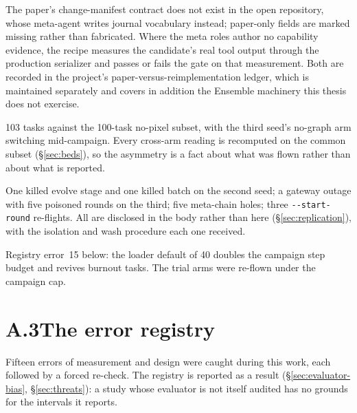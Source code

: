 \begin{description}[leftmargin=1.4em,style=nextline,itemsep=5pt]
  \item[\textnormal{\textbf{Manifest schema and capability evidence.}}]
         The paper's change-manifest contract does not exist in the
        open repository, whose meta-agent writes journal vocabulary
        instead; paper-only fields are marked missing rather than
        fabricated. Where the meta roles author no capability evidence, the
        recipe measures the candidate's real tool output through the
        production serializer and passes or fails the gate on that
        measurement. Both are recorded in the project's
        paper-versus-reimplementation ledger, which is maintained
        separately and covers
        in addition the Ensemble machinery this thesis does not exercise.

  \item[\textnormal{\textbf{Bed asymmetry.}}] 103 tasks against the
        100-task no-pixel subset, with the third seed's no-graph arm
        switching mid-campaign. Every cross-arm reading is recomputed on
        the common subset (\S\ref{sec:beds}), so the asymmetry is a fact
        about what was flown rather than about what is reported.

  \item[\textnormal{\textbf{Replication-arm operational deviations.}}] One
        killed evolve stage and one killed batch on the second seed; a
        gateway outage with five poisoned rounds on the third; five
        meta-chain holes; three \texttt{-{}-start-round} re-flights. All
        are disclosed in the body rather than here
        (\S\ref{sec:replication}), with the isolation and wash procedure
        each one received.

  \item[\textnormal{\textbf{The efficacy trial's \texttt{-{}-max-steps}
        correction.}}] Registry error~15 below: the loader default of 40
        doubles the campaign step budget and revives burnout tasks. The
        trial arms were re-flown under the campaign cap.

\end{description}

\section*{A.3\quad The error registry}

Fifteen errors of measurement and design were caught during this work, each
followed by a forced re-check. The registry is reported as a result
(\S\ref{sec:evaluator-bias}, \S\ref{sec:threats}): a study whose evaluator
is not itself audited has no grounds for the intervals it reports.

